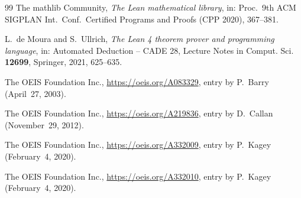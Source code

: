 \documentclass[11pt]{amsart}
\theoremstyle{plain}
\theoremstyle{definition}
\begin{document}
{\begin{thebibliography}{99}
The mathlib Community, \emph{The Lean mathematical library}, in: Proc.\ 9th ACM SIGPLAN Int.\ Conf.\ Certified Programs and Proofs (CPP 2020), 367--381.

L.~de Moura and S.~Ullrich, \emph{The Lean 4 theorem prover and programming language}, in: Automated Deduction -- CADE 28, Lecture Notes in Comput. Sci. \textbf{12699}, Springer, 2021, 625--635.

The OEIS Foundation Inc., \url{https://oeis.org/A083329}, entry by P.~Barry (April~27, 2003).

The OEIS Foundation Inc., \url{https://oeis.org/A219836}, entry by D.~Callan (November~29, 2012).

The OEIS Foundation Inc., \url{https://oeis.org/A332009}, entry by P.~Kagey (February~4, 2020).

The OEIS Foundation Inc., \url{https://oeis.org/A332010}, entry by P.~Kagey (February~4, 2020).

\end{thebibliography}
}
\end{document}
